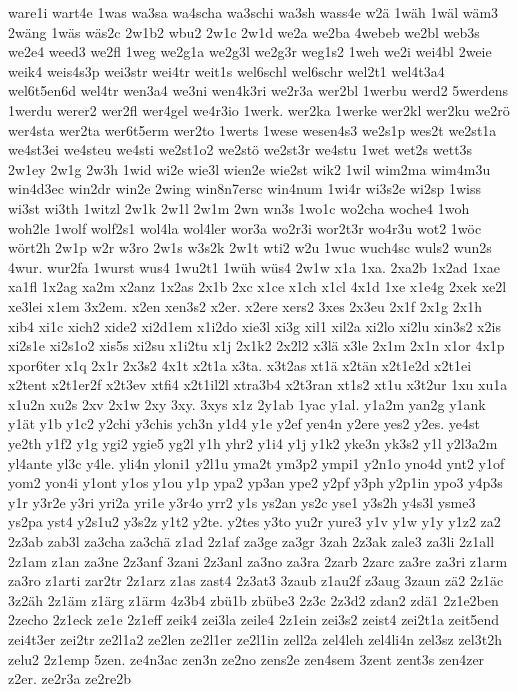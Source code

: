 {ware1i
wart4e
1was
wa3sa
wa4scha
wa3schi
wa3sh
wass4e
w2ä
1wäh
1wäl
wäm3
2wäng
1wäs
wäs2c
2w1b2
wbu2
2w1c
2w1d
we2a
we2ba
4webeb
we2bl
web3s
we2e4
weed3
we2fl
1weg
we2g1a
we2g3l
we2g3r
weg1s2
1weh
we2i
wei4bl
2weie
weik4
weis4s3p
wei3str
wei4tr
weit1s
wel6schl
wel6schr
wel2t1
wel4t3a4
wel6t5en6d
wel4tr
wen3a4
we3ni
wen4k3ri
we2r3a
wer2bl
1werbu
werd2
5werdens
1werdu
werer2
wer2fl
wer4gel
we4r3io
1werk.
wer2ka
1werke
wer2kl
wer2ku
we2rö
wer4sta
wer2ta
wer6t5erm
wer2to
1werts
1wese
wesen4s3
we2s1p
wes2t
we2st1a
we4st3ei
we4steu
we4sti
we2st1o2
we2stö
we2st3r
we4stu
1wet
wet2s
wett3s
2w1ey
2w1g
2w3h
1wid
wi2e
wie3l
wien2e
wie2st
wik2
1wil
wim2ma
wim4m3u
win4d3ec
win2dr
win2e
2wing
win8n7ersc
win4num
1wi4r
wi3s2e
wi2sp
1wiss
wi3st
wi3th
1witzl
2w1k
2w1l
2w1m
2wn
wn3s
1wo1c
wo2cha
woche4
1woh
woh2le
1wolf
wolf2s1
wol4la
wol4ler
wor3a
wo2r3i
wor2t3r
wo4r3u
wot2
1wöc
wört2h
2w1p
w2r
w3ro
2w1s
w3s2k
2w1t
wti2
w2u
1wuc
wuch4sc
wuls2
wun2s
4wur.
wur2fa
1wurst
wus4
1wu2t1
1wüh
wüs4
2w1w
x1a
1xa.
2xa2b
1x2ad
1xae
xa1fl
1x2ag
xa2m
x2anz
1x2as
2x1b
2xc
x1ce
x1ch
x1cl
4x1d
1xe
x1e4g
2xek
xe2l
xe3lei
x1em
3x2em.
x2en
xen3s2
x2er.
x2ere
xers2
3xes
2x3eu
2x1f
2x1g
2x1h
xib4
xi1c
xich2
xide2
xi2d1em
x1i2do
xie3l
xi3g
xil1
xil2a
xi2lo
xi2lu
xin3s2
x2is
xi2s1e
xi2s1o2
xis5s
xi2su
x1i2tu
x1j
2x1k2
2x2l2
x3lä
x3le
2x1m
2x1n
x1or
4x1p
xpor6ter
x1q
2x1r
2x3s2
4x1t
x2t1a
x3ta.
x3t2as
xt1ä
x2tän
x2t1e2d
x2t1ei
x2tent
x2t1er2f
x2t3ev
xtfi4
x2t1il2l
xtra3b4
x2t3ran
xt1s2
xt1u
x3t2ur
1xu
xu1a
x1u2n
xu2s
2xv
2x1w
2xy
3xy.
3xys
x1z
2y1ab
1yac
y1al.
y1a2m
yan2g
y1ank
y1ät
y1b
y1c2
y2chi
y3chis
ych3n
y1d4
y1e
y2ef
yen4n
y2ere
yes2
y2es.
ye4st
ye2th
y1f2
y1g
ygi2
ygie5
yg2l
y1h
yhr2
y1i4
y1j
y1k2
yke3n
yk3s2
y1l
y2l3a2m
yl4ante
yl3c
y4le.
yli4n
yloni1
y2l1u
yma2t
ym3p2
ympi1
y2n1o
yno4d
ynt2
y1of
yom2
yon4i
y1ont
y1os
y1ou
y1p
ypa2
yp3an
ype2
y2pf
y3ph
y2p1in
ypo3
y4p3s
y1r
y3r2e
y3ri
yri2a
yri1e
y3r4o
yrr2
y1s
ys2an
ys2c
yse1
y3s2h
y4s3l
ysme3
ys2pa
yst4
y2s1u2
y3s2z
y1t2
y2te.
y2tes
y3to
yu2r
yure3
y1v
y1w
y1y
y1z2
za2
2z3ab
zab3l
za3cha
za3chä
z1ad
2z1af
za3ge
za3gr
3zah
2z3ak
zale3
za3li
2z1all
2z1am
z1an
za3ne
2z3anf
3zani
2z3anl
za3no
za3ra
2zarb
2zarc
za3re
za3ri
z1arm
za3ro
z1arti
zar2tr
2z1arz
z1as
zast4
2z3at3
3zaub
z1au2f
z3aug
3zaun
zä2
2z1äc
3z2äh
2z1äm
z1ärg
z1ärm
4z3b4
zbü1b
zbübe3
2z3c
2z3d2
zdan2
zdä1
2z1e2ben
2zecho
2z1eck
ze1e
2z1eff
zeik4
zei3la
zeile4
2z1ein
zei3s2
zeist4
zei2t1a
zeit5end
zei4t3er
zei2tr
ze2l1a2
ze2len
ze2l1er
ze2l1in
zell2a
zel4leh
zel4li4n
zel3sz
zel3t2h
zelu2
2z1emp
5zen.
ze4n3ac
zen3n
ze2no
zens2e
zen4sem
3zent
zent3s
zen4zer
z2er.
ze2r3a
ze2re2b
}
